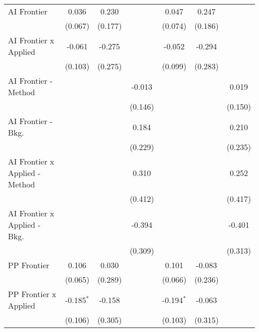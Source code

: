 \begin{tabular}{lcccccc}
   AI Frontier                    & 0.036        & 0.230         &               & 0.047        & 0.247         &   \\   
                                  & (0.067)      & (0.177)       &               & (0.074)      & (0.186)       &   \\   
   AI Frontier x Applied          & -0.061       & -0.275        &               & -0.052       & -0.294        &   \\   
                                  & (0.103)      & (0.275)       &               & (0.099)      & (0.283)       &   \\   
   AI Frontier - Method           &              &               & -0.013        &              &               & 0.019\\   
                                  &              &               & (0.146)       &              &               & (0.150)\\   
   AI Frontier - Bkg.             &              &               & 0.184         &              &               & 0.210\\   
                                  &              &               & (0.229)       &              &               & (0.235)\\   
   AI Frontier x Applied - Method &              &               & 0.310         &              &               & 0.252\\   
                                  &              &               & (0.412)       &              &               & (0.417)\\   
   AI Frontier x Applied - Bkg.   &              &               & -0.394        &              &               & -0.401\\   
                                  &              &               & (0.309)       &              &               & (0.313)\\   
   PP Frontier                    & 0.106        & 0.030         &               & 0.101        & -0.083        &   \\   
                                  & (0.065)      & (0.289)       &               & (0.066)      & (0.236)       &   \\   
   PP Frontier x Applied          & -0.185$^{*}$ & -0.158        &               & -0.194$^{*}$ & -0.063        &   \\   
                                  & (0.106)      & (0.305)       &               & (0.103)      & (0.315)       &   \\   

\end{tabular}
